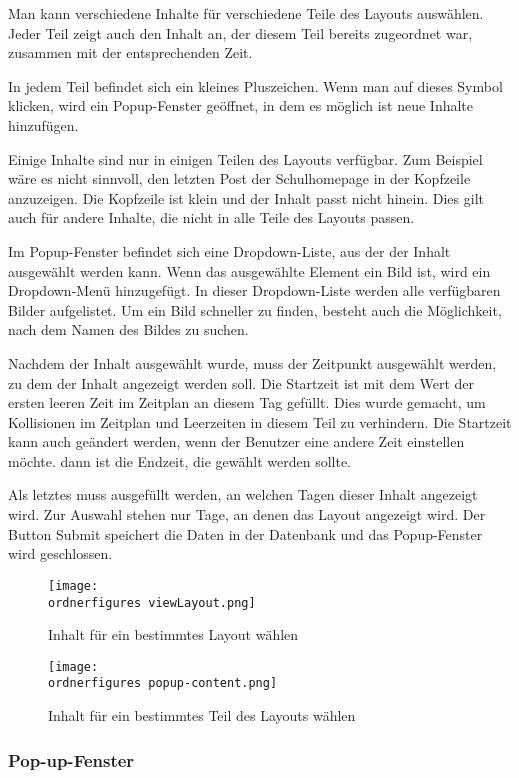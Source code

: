 Man kann verschiedene Inhalte für verschiedene Teile des Layouts auswählen.
Jeder Teil zeigt auch den Inhalt an, der diesem Teil bereits zugeordnet war, zusammen mit der entsprechenden Zeit.

In jedem Teil befindet sich ein kleines Pluszeichen. Wenn man auf dieses Symbol klicken, wird ein Popup-Fenster geöffnet, in dem es m\"oglich ist neue Inhalte hinzufügen.

Einige Inhalte sind nur in einigen Teilen des Layouts verfügbar. Zum Beispiel wäre es nicht sinnvoll, den letzten Post der Schulhomepage in der Kopfzeile anzuzeigen. Die Kopfzeile ist klein und der Inhalt passt nicht hinein. Dies gilt auch für andere Inhalte, die nicht in alle Teile des Layouts passen.

Im Popup-Fenster befindet sich eine Dropdown-Liste, aus der der Inhalt ausgewählt werden kann. Wenn das ausgewählte Element ein Bild ist, wird ein Dropdown-Menü hinzugefügt. In dieser Dropdown-Liste werden alle verfügbaren Bilder aufgelistet. Um ein Bild schneller zu finden, besteht auch die Möglichkeit, nach dem Namen des Bildes zu suchen.

Nachdem der Inhalt ausgewählt wurde, muss der Zeitpunkt ausgewählt werden, zu dem der Inhalt angezeigt werden soll. Die Startzeit ist mit dem Wert der ersten leeren Zeit im Zeitplan an diesem Tag gefüllt. Dies wurde gemacht, um Kollisionen im Zeitplan und Leerzeiten in diesem Teil zu verhindern. Die Startzeit kann auch geändert werden, wenn der Benutzer eine andere Zeit einstellen möchte. dann ist die Endzeit, die gewählt werden sollte.

Als letztes muss ausgefüllt werden, an welchen Tagen dieser Inhalt angezeigt wird. Zur Auswahl stehen nur Tage, an denen das Layout angezeigt wird.
Der Button Submit speichert die Daten in der Datenbank und das Popup-Fenster wird geschlossen.

\begin{figure}[H]
	\centering
	\texttt{[image: \\ordnerfigures viewLayout.png]}
	\caption{Inhalt für ein bestimmtes Layout wählen}
	\label{fi:viewLayout}
\end{figure}

\begin{figure}[H]
	\centering
	\texttt{[image: \\ordnerfigures popup-content.png]}
	\caption{Inhalt für ein bestimmtes Teil des Layouts wählen}
	\label{fi:popup-content}
\end{figure}


\subsubsection{Pop-up-Fenster}

